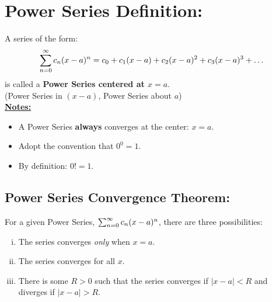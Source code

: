 \renewcommand{\mySubTitle}{Section 6.1: Intro to Power Series\\
\& Series Tests Practice, Round 3}%



\setlength{\columnseprule}{.4pt}
\setlength{\columnsep}{3em}





\section*{Power Series Definition:}
A series of the form:
\[
\sum_{n=0}^\infty c_n (x-a)^n = c_0 + c_1 (x-a) + c_2 (x-a)^2 + c_3 (x-a)^3 +\ldots
\]
is called a \textbf{Power Series centered at \(x=a\)}.\\
 (Power Series in \((x-a)\), Power Series about \(a\))\\
 
\underline{\textbf{Notes:}}
\begin{itemize}
\item A Power Series \textbf{always} converges at the center: \(x=a\).
\item Adopt the convention that \(0^0 = 1\).
\item By definition: \(0! = 1\).
\end{itemize}
 
 
\subsection*{Power Series Convergence Theorem:}
For a given Power Series, \(\sum_{n=0}^\infty c_n (x-a)^n\), there are three possibilities:
 \begin{enumerate}[(i)] 
 \item The series converges \textit{only} when \(x=a\). 
 \item The series converges for all \(x\).
 \item There is some \(R>0\) such that the series converges if \(|x-a|<R\) and diverges if \(|x-a|>R\).
 \end{enumerate}
 
